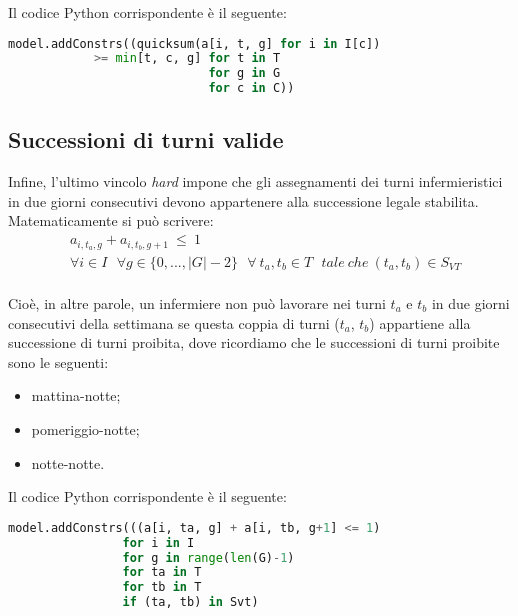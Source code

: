 Il codice Python corrispondente è il seguente:
\begin{lstlisting}[language=Python]
model.addConstrs((quicksum(a[i, t, g] for i in I[c]) 
			>= min[t, c, g] for t in T
							for g in G
							for c in C))
\end{lstlisting}

\subsection{Successioni di turni valide}
Infine, l'ultimo vincolo \textit{hard} impone che gli assegnamenti dei turni infermieristici in due giorni consecutivi devono appartenere alla successione legale stabilita.
Matematicamente si può scrivere:
\begin{equation}
\begin{split}
&a_{i, t_{a}, g} + a_{i, t_{b}, g+1} ~ \leq ~ 1 \\
&\forall i \in I ~~~ \forall g \in \{0,...,|G| - 2\} ~~~ \forall ~ t_{a}, t_{b} \in T ~~~ tale ~ che ~ (t_{a}, t_{b}) \in S_{VT} \\
\end{split}
\end{equation}

Cioè, in altre parole, un infermiere non può lavorare nei turni $t_{a}$ e $t_{b}$ in due giorni consecutivi della settimana se questa coppia di turni ($t_{a}$, $t_{b}$) appartiene alla successione di turni proibita, dove ricordiamo che le successioni di turni proibite sono le seguenti:
\begin{itemize}
\item mattina-notte;
\item pomeriggio-notte;
\item notte-notte.
\end{itemize}

Il codice Python corrispondente è il seguente:
\begin{lstlisting}[language=Python]
model.addConstrs(((a[i, ta, g] + a[i, tb, g+1] <= 1)
                for i in I
                for g in range(len(G)-1) 
                for ta in T
                for tb in T
                if (ta, tb) in Svt)
\end{lstlisting}

